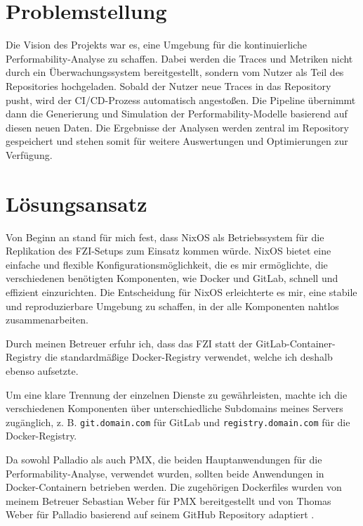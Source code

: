 
\section{Problemstellung} 
Die Vision des Projekts war es, eine Umgebung für die kontinuierliche Performability-Analyse zu schaffen. Dabei werden die Traces und Metriken nicht durch ein Überwachungssystem bereitgestellt, sondern vom Nutzer als Teil des Repositories hochgeladen. Sobald der Nutzer neue Traces in das Repository pusht, wird der CI/CD-Prozess automatisch angestoßen. Die Pipeline übernimmt dann die Generierung und Simulation der Performability-Modelle basierend auf diesen neuen Daten. Die Ergebnisse der Analysen werden zentral im Repository gespeichert und stehen somit für weitere Auswertungen und Optimierungen zur Verfügung.


\section{Lösungsansatz}
Von Beginn an stand für mich fest, dass NixOS als Betriebssystem für die Replikation des FZI-Setups zum Einsatz kommen würde. NixOS bietet eine einfache und flexible Konfigurationsmöglichkeit, die es mir ermöglichte, die verschiedenen benötigten Komponenten, wie Docker und GitLab, schnell und effizient einzurichten. Die Entscheidung für NixOS erleichterte es mir, eine stabile und reproduzierbare Umgebung zu schaffen, in der alle Komponenten nahtlos zusammenarbeiten.

Durch meinen Betreuer erfuhr ich, dass das FZI statt der GitLab-Container-Registry die standardmäßige Docker-Registry verwendet, welche ich deshalb ebenso aufsetzte.

Um eine klare Trennung der einzelnen Dienste zu gewährleisten, machte ich die verschiedenen Komponenten über unterschiedliche Subdomains meines Servers zugänglich, z. B. \texttt{git.domain.com} für GitLab und \texttt{registry.domain.com} für die Docker-Registry.

Da sowohl Palladio als auch PMX, die beiden Hauptanwendungen für die Performability-Analyse, verwendet wurden, sollten beide Anwendungen in Docker-Containern betrieben werden. Die zugehörigen Dockerfiles wurden von meinem Betreuer Sebastian Weber für PMX bereitgestellt und von Thomas Weber für Palladio basierend auf seinem GitHub Repository adaptiert \cite{thomas}.

